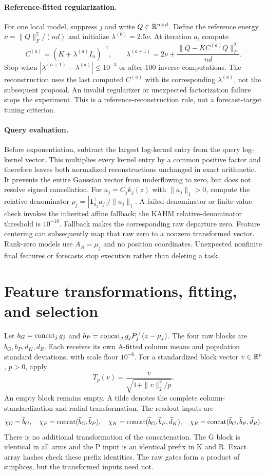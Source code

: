 \paragraph{Reference-fitted regularization.}
For one local model, suppress $j$ and write $Q\in\mathbb R^{n\times d}$. Define the reference energy $\nu=\|Q\|_F^2/(nd)$ and initialize $\lambda^{(0)}=2.5\nu$. At iteration $a$, compute
\[
 C^{(a)}=(K+\lambda^{(a)}I_n)^{-1},\qquad
 \lambda^{(a+1)}=2\nu+\frac{\|Q-KC^{(a)}Q\|_F^2}{nd}.
\]
Stop when $|\lambda^{(a+1)}-\lambda^{(a)}|\leq10^{-3}$ or after 100 inverse computations. The reconstruction uses the last computed $C^{(a)}$ with its corresponding $\lambda^{(a)}$, not the subsequent proposal. An invalid regularizer or unexpected factorization failure stops the experiment. This is a reference-reconstruction rule, not a forecast-target tuning criterion.

\paragraph{Query evaluation.}
Before exponentiation, subtract the largest log-kernel entry from the query log-kernel vector. This multiplies every kernel entry by a common positive factor and therefore leaves both normalized reconstructions unchanged in exact arithmetic. It prevents the entire Gaussian vector from underflowing to zero, but does not resolve signed cancellation. For $a_j=C_jk_j(z)$ with $\|a_j\|_1>0$, compute the relative denominator $\rho_j=|\mathbf1_{n_j}^\top a_j|/\|a_j\|_1$. A failed denominator or finite-value check invokes the inherited affine fallback; the KAHM relative-denominator threshold is $10^{-10}$. Fallback makes the corresponding raw departure zero. Feature centering can subsequently map that raw zero to a nonzero transformed vector. Rank-zero models use $A_A=\mu_j$ and no position coordinates. Unexpected nonfinite final features or forecasts stop execution rather than deleting a task.

\section{Feature transformations, fitting, and selection}\label{supp:fitting}
Let $b_G=\operatorname{concat}_j g_j$ and $b_P=\operatorname{concat}_j g_jP_j^\top(z-\mu_j)$. The four raw blocks are $b_G,b_P,d_K,d_R$. Each receives its own A-fitted column means and population standard deviations, with scale floor $10^{-6}$. For a standardized block vector $v\in\mathbb R^p$, $p>0$, apply
\[
 T_p(v)=\frac{v}{\sqrt{1+\|v\|_2^2/p}}.
\]
An empty block remains empty. A tilde denotes the complete column-standardization and radial transformation. The readout inputs are
\[
 \chi_G=\widetilde b_G,\quad
 \chi_P=\operatorname{concat}(\widetilde b_G,\widetilde b_P),\quad
 \chi_K=\operatorname{concat}(\widetilde b_G,\widetilde b_P,\widetilde d_K),\quad
 \chi_R=\operatorname{concat}(\widetilde b_G,\widetilde b_P,\widetilde d_R).
\]
There is no additional transformation of the concatenation. The G block is identical in all arms and the P input is an identical prefix in K and R. Exact array hashes check these prefix identities. The raw gates form a product of simplices, but the transformed inputs need not.

